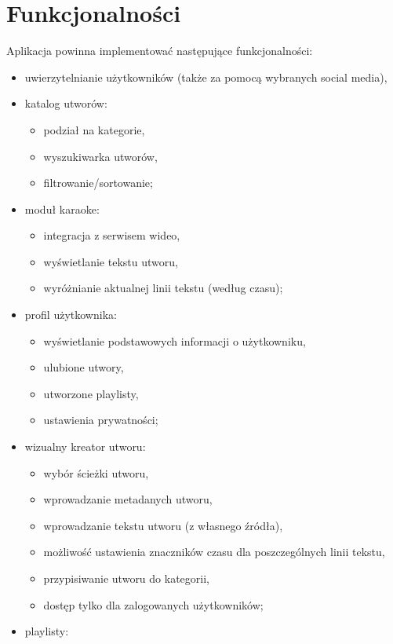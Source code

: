 \documentclass[11pt]{article}
\begin{document}
  \section{Funkcjonalności}
  Aplikacja powinna implementować następujące funkcjonalności:
  \begin{itemize}
    \item uwierzytelnianie użytkowników (także za pomocą wybranych social media),
    \item katalog utworów:
    \begin{itemize}
      \item podział na kategorie,
      \item wyszukiwarka utworów,
      \item filtrowanie/sortowanie;
    \end{itemize}
    \item moduł karaoke:
    \begin{itemize}
      \item integracja z serwisem wideo,
      \item wyświetlanie tekstu utworu,
      \item wyróżnianie aktualnej linii tekstu (według czasu);
    \end{itemize}
    \item profil użytkownika:
    \begin{itemize}
      \item wyświetlanie podstawowych informacji o użytkowniku,
      \item ulubione utwory,
      \item utworzone playlisty,
      \item ustawienia prywatności;
    \end{itemize}
    \item wizualny kreator utworu:
    \begin{itemize}
      \item wybór ścieżki utworu,
      \item wprowadzanie metadanych utworu,
      \item wprowadzanie tekstu utworu (z własnego źródła),
      \item możliwość ustawienia znaczników czasu dla poszczególnych linii tekstu,
      \item przypisiwanie utworu do kategorii,
      \item dostęp tylko dla zalogowanych użytkowników;
    \end{itemize}
    \item playlisty:

\end{itemize}
\end{document}
